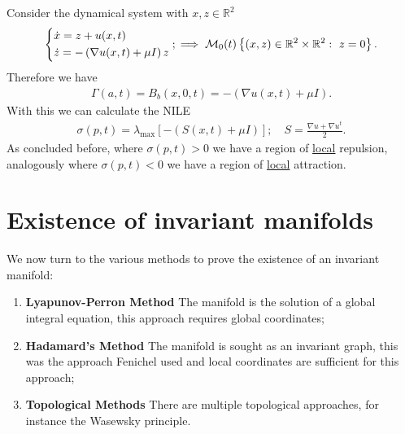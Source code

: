 \begin{ex}
	Consider the dynamical system with $x,z\in \mathbb{R}^{2}$
	\begin{align}
		\begin{dcases}
			\dot{x} = z + u(x,t) \\
			\dot{z} = - \left( \nabla u(x,t) + \mu I \right) z
		\end{dcases}
		; \implies \mathcal{M}_{0}(t) \left\{ (x,z) \in \mathbb{R}^{2}\times \mathbb{R}^{2}:\ z =0\right\}.	
	\end{align}
Therefore we have 
\begin{align}
	\Gamma(a,t) = B_{b}(x,0,t) = - \left(\nabla u(x,t) + \mu I \right).
\end{align}
With this we can calculate the NILE
\begin{align}
	\sigma(p,t) = \lambda _{ \textrm{max} } \left[ - (S(x,t) + \mu I ) \right]; \quad S = \frac{\nabla u + \nabla u^{t}}{2}.
\end{align}
As concluded before, where $\sigma(p,t)>0$ we have a region of \underline{local} repulsion, analogously where $\sigma(p,t) <0$ we have a region of \underline{local} attraction.
\end{ex}

\section{Existence of invariant manifolds}
We now turn to the various methods to prove the existence of an invariant manifold:
\begin{enumerate}
	\item \textbf{Lyapunov-Perron Method} The manifold is the solution of a global integral equation, this approach requires global coordinates;
	\item \textbf{Hadamard's Method} The manifold is sought as an invariant graph, this was the approach Fenichel used and local coordinates are sufficient for this approach;
	\item \textbf{Topological Methods} There are multiple topological approaches, for instance the Wasewsky principle.
\end{enumerate}

